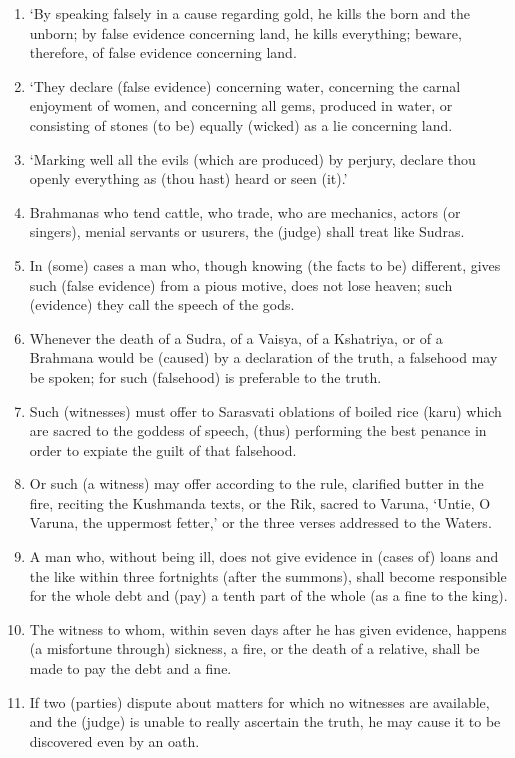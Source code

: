 \begin{enumerate}
\item `By speaking falsely in a cause regarding gold, he kills the born and the unborn; by false evidence concerning land, he kills everything; beware, therefore, of false evidence concerning land.
\item `They declare (false evidence) concerning water, concerning the carnal enjoyment of women, and concerning all gems, produced in water, or consisting of stones (to be) equally (wicked) as a lie concerning land.
\item `Marking well all the evils (which are produced) by perjury, declare thou openly everything as (thou hast) heard or seen (it).'
\item Brahmanas who tend cattle, who trade, who are mechanics, actors (or singers), menial servants or usurers, the (judge) shall treat like Sudras.
\item In (some) cases a man who, though knowing (the facts to be) different, gives such (false evidence) from a pious motive, does not lose heaven; such (evidence) they call the speech of the gods.
\item Whenever the death of a Sudra, of a Vaisya, of a Kshatriya, or of a Brahmana would be (caused) by a declaration of the truth, a falsehood may be spoken; for such (falsehood) is preferable to the truth.
\item Such (witnesses) must offer to Sarasvati oblations of boiled rice (karu) which are sacred to the goddess of speech, (thus) performing the best penance in order to expiate the guilt of that falsehood.
\item Or such (a witness) may offer according to the rule, clarified butter in the fire, reciting the Kushmanda texts, or the Rik, sacred to Varuna, `Untie, O Varuna, the uppermost fetter,' or the three verses addressed to the Waters.
\item A man who, without being ill, does not give evidence in (cases of) loans and the like within three fortnights (after the summons), shall become responsible for the whole debt and (pay) a tenth part of the whole (as a fine to the king).
\item The witness to whom, within seven days after he has given evidence, happens (a misfortune through) sickness, a fire, or the death of a relative, shall be made to pay the debt and a fine.
\item If two (parties) dispute about matters for which no witnesses are available, and the (judge) is unable to really ascertain the truth, he may cause it to be discovered even by an oath.

\end{enumerate}
